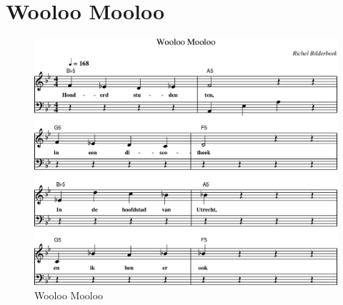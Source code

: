 \chapter{Wooloo Mooloo}



\begin{figure}[!htbp]
  \includegraphics[width=\textwidth,height=\textheight,keepaspectratio]{../songs/21_wooloo_mooloo.png}
  \caption{Wooloo Mooloo}
  \label{fig:21_wooloo_mooloo}
\end{figure}
